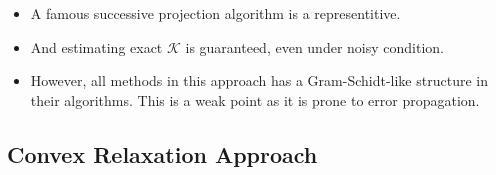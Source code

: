 \documentclass[10pt,xcolor={usenames,dvipsnames,table}]{beamer}
\begin{document}
\begin{frame}
{\begin{itemize}
        \item A famous successive projection algorithm is a representitive.
        \item And estimating exact $\mathcal{K}$ is guaranteed, even under noisy condition.
        \item However, all methods in this approach has a Gram-Schidt-like structure in their algorithms. This is a weak point as it is prone to error propagation.
\end{itemize}
     }
\end{frame}


\subsection{Convex Relaxation Approach}%
\label{sub:convex_relaxation_approach}
\end{document}
